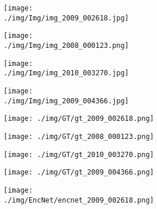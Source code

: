 \documentclass[10pt,twocolumn,letterpaper]{article}
\begin{document}
\begin{figure}
\center
    \begin{subfigure}[t]{0.11\textwidth}
            \begin{subfigure}[t]{\textwidth}
                \texttt{[image: ./img/Img/img\_2009\_002618.jpg]}
            \end{subfigure}\vspace{.6ex}

            \begin{subfigure}[t]{\textwidth}
                \texttt{[image: ./img/Img/img\_2008\_000123.png]}
            \end{subfigure}\vspace{.6ex}

         \begin{subfigure}[t]{\textwidth}
                \texttt{[image: ./img/Img/img\_2010\_003270.jpg]}
            \end{subfigure}\vspace{.6ex}

            \begin{subfigure}[t]{\textwidth}
                \texttt{[image: ./img/Img/img\_2009\_004366.jpg]}
            \end{subfigure}
     \end{subfigure}
\begin{subfigure}[t]{0.11\textwidth}
        \begin{subfigure}[t]{\textwidth}
                \texttt{[image: ./img/GT/gt\_2009\_002618.png]}
            \end{subfigure}\vspace{.6ex}

        \begin{subfigure}[t]{\textwidth}
                \texttt{[image: ./img/GT/gt\_2008\_000123.png]}
            \end{subfigure}\vspace{.6ex}

        \begin{subfigure}[t]{\textwidth}
                \texttt{[image: ./img/GT/gt\_2010\_003270.png]}
            \end{subfigure}\vspace{.6ex}

            \begin{subfigure}[t]{\textwidth}
                \texttt{[image: ./img/GT/gt\_2009\_004366.png]}
     \captionsetup{justification=centering}       
            \end{subfigure}
    \end{subfigure}
\begin{subfigure}[t]{0.11\textwidth}
        \begin{subfigure}[t]{\textwidth}
                \texttt{[image: ./img/EncNet/encnet\_2009\_002618.png]}
            \end{subfigure}\vspace{.6ex}


\end{subfigure}
\end{figure}
\end{document}
